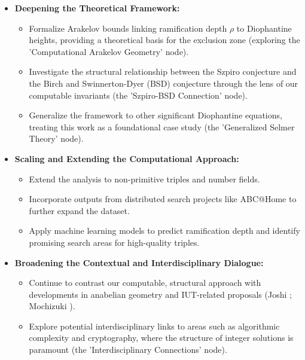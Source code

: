 \documentclass[11pt,a4paper]{article}
\begin{document}
\begin{itemize}
    \item \textbf{Deepening the Theoretical Framework:}
        \begin{itemize}
            \item Formalize Arakelov bounds linking ramification depth $\rho$ to Diophantine heights, providing a theoretical basis for the exclusion zone (exploring the 'Computational Arakelov Geometry' node).
            \item Investigate the structural relationship between the Szpiro conjecture and the Birch and Swinnerton-Dyer (BSD) conjecture through the lens of our computable invariants (the 'Szpiro-BSD Connection' node).
            \item Generalize the framework to other significant Diophantine equations, treating this work as a foundational case study (the 'Generalized Selmer Theory' node).
        \end{itemize}

    \item \textbf{Scaling and Extending the Computational Approach:}
        \begin{itemize}
            \item Extend the analysis to non-primitive triples and number fields.
            \item Incorporate outputs from distributed search projects like ABC@Home to further expand the dataset.
            \item Apply machine learning models to predict ramification depth and identify promising search areas for high-quality triples.
        \end{itemize}

    \item \textbf{Broadening the Contextual and Interdisciplinary Dialogue:}
        \begin{itemize}
            \item Continue to contrast our computable, structural approach with developments in anabelian geometry and IUT-related proposals (Joshi \cite{joshi2025}; Mochizuki \cite{mochizuki2021}).
            \item Explore potential interdisciplinary links to areas such as algorithmic complexity and cryptography, where the structure of integer solutions is paramount (the 'Interdisciplinary Connections' node).
        \end{itemize}
\end{itemize}
\end{document}
